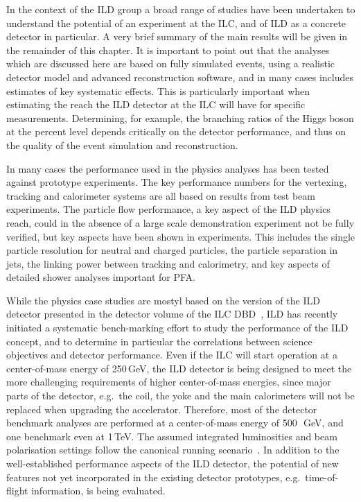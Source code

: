 In the context of the ILD group a broad range of studies have been undertaken to understand the potential of an experiment at the ILC, and of ILD as a concrete detector in particular. A very brief summary of the main results will be given in the remainder of this chapter. It is important to point out that 
 the analyses which are discussed here are based on fully simulated events, using a realistic detector model and advanced reconstruction software, and in many cases includes estimates of key systematic effects. This is particularly important when estimating the reach the ILD detector at the ILC will have for specific measurements. Determining, for example, the branching ratios of the Higgs boson at the percent level depends critically on the detector performance, and thus on the quality of the event simulation and reconstruction. 

In many cases the performance used in the physics analyses has been tested against prototype experiments. The key performance numbers for the vertexing, tracking and calorimeter systems are all based on results from test beam experiments. The particle flow performance, a key aspect of the ILD physics reach, could in the absence of a large scale demonstration experiment not be fully verified, but key aspects have been shown in experiments. This includes the single particle resolution for neutral and charged particles, the particle separation in jets, the linking power between tracking and calorimetry, and key aspects of detailed shower analyses important for PFA. 

While the physics case studies are mostyl based on the version of the ILD detector presented in the detector volume of the ILC DBD~\cite{ild:bib:ILDDBD}, ILD has recently initiated a systematic bench-marking effort to study the performance of the ILD concept, and to determine in particular the correlations between science objectives and detector performance. 
Even if the ILC will start operation at a center-of-mass energy of 250\,GeV, the ILD detector is being designed to meet the more challenging requirements of higher center-of-mass energies, since major parts of the detector, e.g.\ the coil, the yoke and the main calorimeters will not be replaced when upgrading the accelerator. Therefore, most of the detector benchmark analyses are performed at a center-of-mass energy of 500\,~GeV, and one benchmark even at 1\,TeV. The assumed integrated luminosities and beam polarisation settings follow the canonical running scenario~\cite{Barklow:2015tja}. 
In addition to the well-established performance aspects of the ILD detector, the potential of new features not yet incorporated in the existing detector prototypes, e.g.\ time-of-flight information, is being evaluated. 
